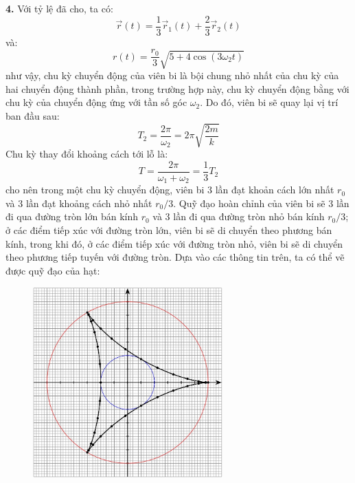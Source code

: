 \noindent\textbf{4.} Với tỷ lệ đã cho, ta có:
\begin{equation*}
  \vec{r}(t)=\frac{1}{3}\vec{r}_{1}(t)+\frac{2}{3}\vec{r}_{2}(t)
\end{equation*}
và:
\begin{equation*}
  r(t)=\frac{r_{0}}{3}\sqrt{5+4\cos(3\omega_{2}t)}
\end{equation*}
như vậy, chu kỳ chuyển động của viên bi là bội chung nhỏ nhất của chu kỳ của hai chuyển động thành phần, trong trường hợp này, chu kỳ chuyển động bằng với chu kỳ của chuyển động ứng với tần số góc $\omega_{2}$. Do đó, viên bi sẽ quay lại vị trí ban đầu sau:
\begin{equation*}
  T_{2}=\frac{2\pi}{\omega_{2}}=2\pi\sqrt{\frac{2m}{k}}
\end{equation*}
Chu kỳ thay đổi khoảng cách tới lỗ là:
\begin{equation*}
  T=\frac{2\pi}{\omega_{1}+\omega_{2}}=\frac{1}{3}T_{2}
\end{equation*}
cho nên trong một chu kỳ chuyển động, viên bi 3 lần đạt khoản cách lớn nhất $r_{0}$ và $3$ lần đạt khoảng cách nhỏ nhất $r_{0}/3$. Quỹ đạo hoàn chỉnh của viên bi sẽ $3$ lần đi qua đường tròn lớn bán kính $r_{0}$ và $3$ lần đi qua đường tròn nhỏ bán kính $r_{0}/3$; ở các điểm tiếp xúc với đường tròn lớn, viên bi sẽ di chuyển theo phương bán kính, trong khi đó, ở các điểm tiếp xúc với đường tròn nhỏ, viên bi sẽ di chuyển theo phương tiếp tuyến với đường tròn. Dựa vào các thông tin trên, ta có thể vẽ được quỹ đạo của hạt:
\begin{figure}
  \centering
  \includegraphics[width=0.65\textwidth]{Figures/Fig 1S2.jpg}
\end{figure}
